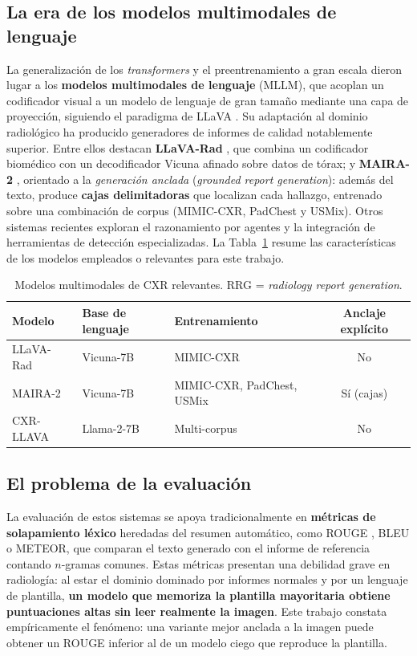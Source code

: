 \subsection{La era de los modelos multimodales de lenguaje}
La generalización de los \textit{transformers} y el preentrenamiento a gran escala dieron lugar a los
\textbf{modelos multimodales de lenguaje} (MLLM), que acoplan un codificador visual a un modelo de
lenguaje de gran tamaño mediante una capa de proyección, siguiendo el paradigma de LLaVA
\parencite{liu2023llava}. Su adaptación al dominio radiológico ha producido generadores de informes
de calidad notablemente superior. Entre ellos destacan \textbf{LLaVA-Rad} \parencite{llavarad2024},
que combina un codificador biomédico con un decodificador Vicuna afinado sobre datos de tórax; y
\textbf{MAIRA-2} \parencite{maira2}, orientado a la \textit{generación anclada} (\textit{grounded
report generation}): además del texto, produce \textbf{cajas delimitadoras} que localizan cada
hallazgo, entrenado sobre una combinación de corpus (MIMIC-CXR, PadChest y USMix). Otros sistemas
recientes exploran el razonamiento por agentes y la integración de herramientas de detección
especializadas. La Tabla~\ref{tab:modelos} resume las características de los modelos empleados o
relevantes para este trabajo.

\begin{table}[t]\centering
\caption{Modelos multimodales de CXR relevantes. RRG = \textit{radiology report generation}.}
\label{tab:modelos}
\begin{tabular}{lllc}
\toprule
Modelo & Base de lenguaje & Entrenamiento & Anclaje explícito \\ \midrule
LLaVA-Rad & Vicuna-7B & MIMIC-CXR & No \\
MAIRA-2   & Vicuna-7B & MIMIC-CXR, PadChest, USMix & Sí (cajas) \\
CXR-LLAVA & Llama-2-7B & Multi-corpus & No \\ \bottomrule
\end{tabular}
\end{table}

\subsection{El problema de la evaluación}
La evaluación de estos sistemas se apoya tradicionalmente en \textbf{métricas de solapamiento léxico}
heredadas del resumen automático, como ROUGE \parencite{lin2004rouge}, BLEU o METEOR, que comparan el
texto generado con el informe de referencia contando $n$-gramas comunes. Estas métricas presentan una
debilidad grave en radiología: al estar el dominio dominado por informes normales y por un lenguaje
de plantilla, \textbf{un modelo que memoriza la plantilla mayoritaria obtiene puntuaciones altas sin
leer realmente la imagen}. Este trabajo constata empíricamente el fenómeno: una variante mejor
anclada a la imagen puede obtener un ROUGE inferior al de un modelo ciego que reproduce la plantilla.


